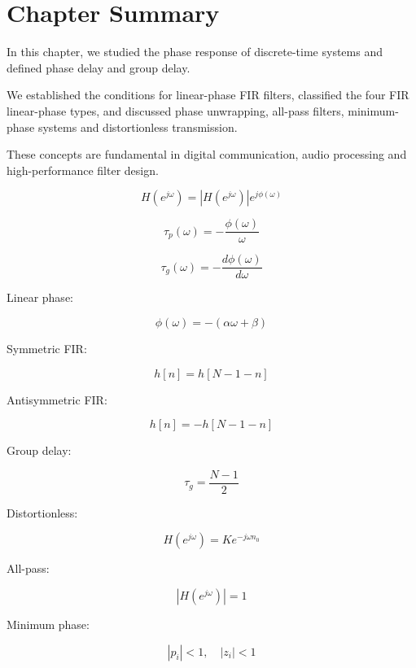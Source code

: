 \section{Chapter Summary}

In this chapter, we studied the phase response of discrete-time systems and
defined phase delay and group delay.

We established the conditions for linear-phase FIR filters, classified the four
FIR linear-phase types, and discussed phase unwrapping, all-pass filters,
minimum-phase systems and distortionless transmission.

These concepts are fundamental in digital communication, audio processing and
high-performance filter design.


\begin{tcolorbox}[title=One-Minute Revision,colback=blue!5]

\[
H(e^{j\omega})=
|H(e^{j\omega})|e^{j\phi(\omega)}
\]

\[
\tau_p(\omega)=
-\frac{\phi(\omega)}{\omega}
\]

\[
\tau_g(\omega)=
-\frac{d\phi(\omega)}{d\omega}
\]

Linear phase:

\[
\phi(\omega)=-(\alpha\omega+\beta)
\]

Symmetric FIR:

\[
h[n]=h[N-1-n]
\]

Antisymmetric FIR:

\[
h[n]=-h[N-1-n]
\]

Group delay:

\[
\tau_g=\frac{N-1}{2}
\]

Distortionless:

\[
H(e^{j\omega})=Ke^{-j\omega n_0}
\]

All-pass:

\[
|H(e^{j\omega})|=1
\]

Minimum phase:

\[
|p_i|<1,\quad |z_i|<1
\]

\end{tcolorbox}
